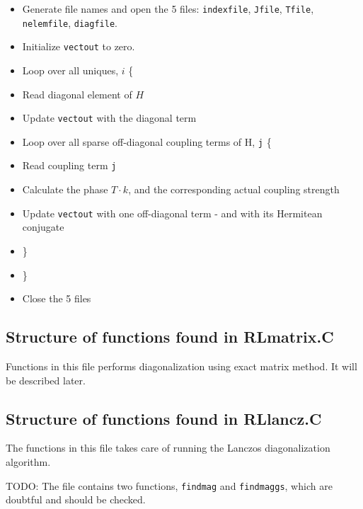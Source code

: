 \documentclass{article}
\begin{document}
\begin{itemize}
\item Generate file names and open the 5 files: \verb+indexfile+, \verb+Jfile+, \verb+Tfile+, \verb+nelemfile+, \verb+diagfile+.
\item Initialize \verb+vectout+ to zero.
\item Loop over all uniques, $i$ \{
\item \hspace{5mm} Read diagonal element of $H$
\item \hspace{5mm} Update \verb+vectout+ with the diagonal term
\item \hspace{5mm} Loop over all sparse off-diagonal coupling terms of H, \verb+j+ \{
\item \hspace{10mm} Read coupling term \verb+j+
\item \hspace{10mm} Calculate the phase $T \cdot k$, and the corresponding actual coupling strength
\item \hspace{10mm} Update \verb+vectout+ with one off-diagonal term - and with its Hermitean conjugate
\item \hspace{5mm} \}
\item \}
\item Close the 5 files
\end{itemize}

\subsection{Structure of functions found in RLmatrix.C} 
Functions in this file performs diagonalization using exact matrix method. It will be described later.

\subsection{Structure of functions found in RLlancz.C} 
The functions in this file takes care of running the Lanczos diagonalization algorithm.

TODO: The file contains two functions, \verb+findmag+ and \verb+findmaggs+, which are doubtful and should be checked.
\end{document}
